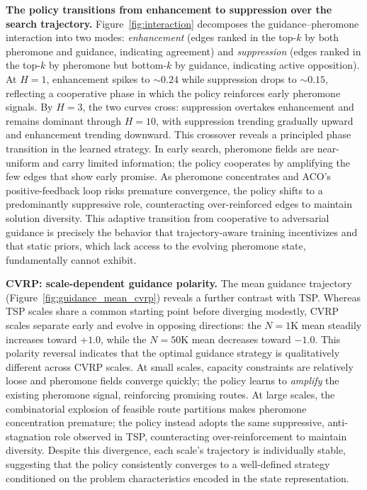 \documentclass[sigconf,review]{acmart}
\begin{document}
\textbf{The policy transitions from enhancement to suppression over the search trajectory.}
Figure~\ref{fig:interaction} decomposes the guidance--pheromone interaction into two modes: \emph{enhancement} (edges ranked in the top-$k$ by both pheromone and guidance, indicating agreement) and \emph{suppression} (edges ranked in the top-$k$ by pheromone but bottom-$k$ by guidance, indicating active opposition).
At $H{=}1$, enhancement spikes to ${\sim}0.24$ while suppression drops to ${\sim}0.15$, reflecting a cooperative phase in which the policy reinforces early pheromone signals.
By $H{=}3$, the two curves cross: suppression overtakes enhancement and remains dominant through $H{=}10$, with suppression trending gradually upward and enhancement trending downward.
This crossover reveals a principled phase transition in the learned strategy.
In early search, pheromone fields are near-uniform and carry limited information; the policy cooperates by amplifying the few edges that show early promise.
As pheromone concentrates and ACO's positive-feedback loop risks premature convergence, the policy shifts to a predominantly suppressive role, counteracting over-reinforced edges to maintain solution diversity.
This adaptive transition from cooperative to adversarial guidance is precisely the behavior that trajectory-aware training incentivizes and that static priors, which lack access to the evolving pheromone state, fundamentally cannot exhibit.

\textbf{CVRP: scale-dependent guidance polarity.}
The mean guidance trajectory (Figure~\ref{fig:guidance_mean_cvrp}) reveals a further contrast with TSP.
Whereas TSP scales share a common starting point before diverging modestly, CVRP scales separate early and evolve in opposing directions: the $N{=}1$K mean steadily increases toward $+1.0$, while the $N{=}50$K mean decreases toward $-1.0$.
This polarity reversal indicates that the optimal guidance strategy is qualitatively different across CVRP scales.
At small scales, capacity constraints are relatively loose and pheromone fields converge quickly; the policy learns to \emph{amplify} the existing pheromone signal, reinforcing promising routes.
At large scales, the combinatorial explosion of feasible route partitions makes pheromone concentration premature; the policy instead adopts the same suppressive, anti-stagnation role observed in TSP, counteracting over-reinforcement to maintain diversity.
Despite this divergence, each scale's trajectory is individually stable, suggesting that the policy consistently converges to a well-defined strategy conditioned on the problem characteristics encoded in the state representation.
\end{document}
